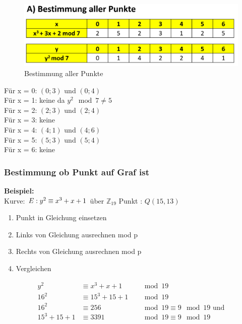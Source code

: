 \documentclass[12pt]{scrartcl}
\begin{document}
\begin{figure}[ht]
    \centering
    \includegraphics[width=\textwidth]{img/bestimung_aller_punkte.png}
    \caption{Bestimmung aller Punkte}
    \label{fig:bestimmung_aller_punkte}
\end{figure}

Für x = 0: $(0; 3)$ und $(0; 4)$ \\
Für x = 1: keine da $y^2 \mod 7 \neq 5$ \\
Für x = 2: $(2; 3)$ und $(2; 4)$ \\
Für x = 3: keine \\
Für x = 4: $(4; 1)$ und $(4; 6)$ \\
Für x = 5: $(5; 3)$ und $(5; 4)$ \\
Für x = 6: keine \\




\subsubsection{Bestimmung ob Punkt auf Graf ist}

\textbf{Beispiel:}\\

Kurve: $E: \space y^2 \equiv x^3 + x + 1$ über $\mathbb{Z}_{19}$
Punkt : $Q(15, 13)$

\begin{enumerate}
    \item Punkt in Gleichung einsetzen
    \item Links von Gleichung ausrechnen mod p
    \item Rechts von Gleichung ausrechnen mod p
    \item Vergleichen
\end{enumerate}

\begin{align}
    y^2 &\equiv x^3 + x + 1 &&\mod 19 \\
    16^2 &\equiv 15^3 + 15 + 1 &&\mod 19 \\
    16^2 &\equiv 256 &&\mod 19 \equiv 9 \mod 19 \text{ und} \\
    15^3 + 15 + 1 &\equiv 3391 &&\mod 19 \equiv 9 \mod 19
\end{align}
\end{document}
